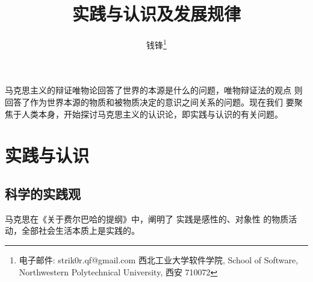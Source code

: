 \documentclass[utf-8, 10pt]{article}
\begin{document}

\title{实践与认识及发展规律}
\author{钱锋\thanks{电子邮件: strik0r.qf@gmail.com
\newline \indent 西北工业大学软件学院, School of Software, Northwestern Polytechnical University, 西安 710072
}}

\maketitle
\thispagestyle{empty}
    

{\small \tableofcontents}

马克思主义的辩证唯物论回答了世界的本源是什么的问题，唯物辩证法的观点
则回答了作为世界本源的物质和被物质决定的意识之间关系的问题。现在我们
要聚焦于人类本身，开始探讨马克思主义的认识论，即实践与认识的有关问题。

\section{实践与认识}

\subsection{科学的实践观}

马克思在《关于费尔巴哈的提纲》中，阐明了{\color{red} 实践是感性的、对象性
的物质活动，全部社会生活本质上是实践的}。
\end{document}

